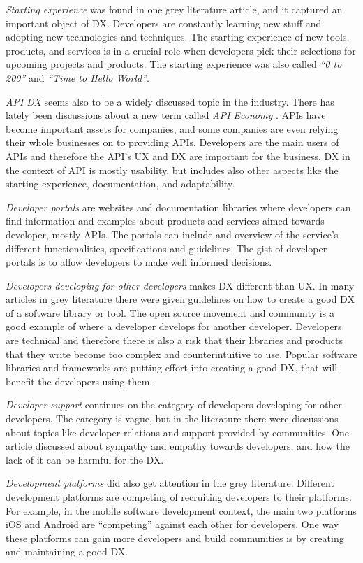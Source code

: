 \documentclass[english, 12pt, a4paper, sci, utf8, a-1b, online]{aaltothesis}
\begin{document}
\textit{Starting experience} was found in one grey literature article, and it captured an important object of DX. Developers are constantly learning new stuff and adopting new technologies and techniques. The starting experience of new tools, products, and services is in a crucial role when developers pick their selections for upcoming projects and products. The starting experience was also called \textit{``0 to 200''} and \textit{``Time to Hello World''}.

\textit{API DX} seems also to be a widely discussed topic in the industry. There has lately been discussions about a new term called \textit{API Economy} \textcite{web-api-economy}. APIs have become important assets for companies, and some companies are even relying their whole businesses on to providing APIs. Developers are the main users of APIs and therefore the API's UX and DX are important for the business. DX in the context of API is mostly usability, but includes also other aspects like the starting experience, documentation, and adaptability.

\textit{Developer portals} are websites and documentation libraries where developers can find information and examples about products and services aimed towards developer, mostly APIs. The portals can include and overview of the service's different functionalities, specifications and guidelines. The gist of developer portals is to allow developers to make well informed decisions.

\textit{Developers developing for other developers} makes DX different than UX. In many articles in grey literature there were given guidelines on how to create a good DX of a software library or tool. The open source movement and community is a good example of where a developer develops for another developer. Developers are technical and therefore there is also a risk that their libraries and products that they write become too complex and counterintuitive to use. Popular software libraries and frameworks are putting effort into creating a good DX, that will benefit the developers using them.

\textit{Developer support} continues on the category of developers developing for other developers. The category is vague, but in the literature there were discussions about topics like developer relations and support provided by communities. One article discussed about sympathy and empathy towards developers, and how the lack of it can be harmful for the DX.

\textit{Development platforms} did also get attention in the grey literature. Different development platforms are competing of recruiting developers to their platforms. For example, in the mobile software development context, the main two platforms iOS and Android are ``competing'' against each other for developers. One way these platforms can gain more developers and build communities is by creating and maintaining a good DX.
\end{document}
